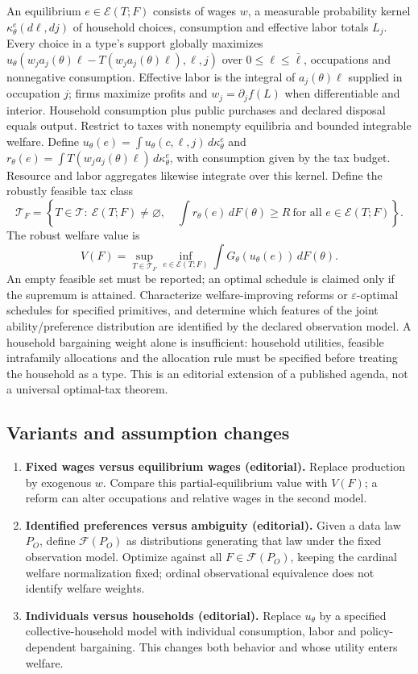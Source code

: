 \documentclass[11pt,a4paper]{article}
\begin{document}
An equilibrium \(e\in\mathcal E(T;F)\) consists of wages \(w\), a measurable probability kernel \(\kappa_\theta^e(d\ell,dj)\) of household choices, consumption and effective labor totals \(L_j\). Every choice in a type's support globally maximizes \(u_\theta(w_ja_j(\theta)\ell-T(w_ja_j(\theta)\ell),\ell,j)\) over \(0\leq\ell\leq\bar\ell\), occupations and nonnegative consumption. Effective labor is the integral of \(a_j(\theta)\ell\) supplied in occupation \(j\); firms maximize profits and \(w_j=\partial_j f(L)\) when differentiable and interior. Household consumption plus public purchases and declared disposal equals output. Restrict to taxes with nonempty equilibria and bounded integrable welfare. Define \(u_\theta(e)=\int u_\theta(c,\ell,j)\,d\kappa_\theta^e\) and \(r_\theta(e)=\int T(w_ja_j(\theta)\ell)\,d\kappa_\theta^e\), with consumption given by the tax budget. Resource and labor aggregates likewise integrate over this kernel. Define the robustly feasible tax class
\[
 \mathcal T_F=\left\{T\in\mathcal T:\ \mathcal E(T;F)\ne\varnothing,\quad
 \int r_\theta(e)\,dF(\theta)\ge R\ \text{for all }e\in\mathcal E(T;F)\right\}.
\]
The robust welfare value is
\[
 V(F)=\sup_{T\in\mathcal T_F}\inf_{e\in\mathcal E(T;F)}
 \int G_\theta(u_\theta(e))\,dF(\theta).
\]
An empty feasible set must be reported; an optimal schedule is claimed only if the supremum is attained. Characterize welfare-improving reforms or \(\varepsilon\)-optimal schedules for specified primitives, and determine which features of the joint ability/preference distribution are identified by the declared observation model. A household bargaining weight alone is insufficient: household utilities, feasible intrafamily allocations and the allocation rule must be specified before treating the household as a type. This is an editorial extension of a published agenda, not a universal optimal-tax theorem.
\subsection*{Variants and assumption changes}
\begin{enumerate}
\item \textbf{Fixed wages versus equilibrium wages (editorial).} Replace production by exogenous \(w\). Compare this partial-equilibrium value with \(V(F)\); a reform can alter occupations and relative wages in the second model.
\item \textbf{Identified preferences versus ambiguity (editorial).} Given a data law \(P_O\), define \(\mathcal F(P_O)\) as distributions generating that law under the fixed observation model. Optimize against all \(F\in\mathcal F(P_O)\), keeping the cardinal welfare normalization fixed; ordinal observational equivalence does not identify welfare weights.
\item \textbf{Individuals versus households (editorial).} Replace \(u_\theta\) by a specified collective-household model with individual consumption, labor and policy-dependent bargaining. This changes both behavior and whose utility enters welfare.
\end{enumerate}
\end{document}
